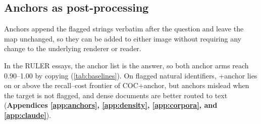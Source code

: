 \subsection{Anchors as post-processing}
\label{sec:anchors}


Anchors append the flagged strings verbatim after the question and leave the map unchanged, so they can be added to either image without requiring any change to the underlying renderer or reader. 


In the RULER essays, the anchor list is the answer, so both anchor arms reach 0.90--1.00 by copying (\cref{tab:baselines}).  
On flagged natural identifiers, \name+anchor lies on or above the recall--cost frontier of COC+anchor, but anchors mislead when the target is not flagged, and dense documents are better routed to text (\textbf{Appendices \ref{app:anchors}, \ref{app:density}, \ref{app:corpora}, and \ref{app:claude}}).
